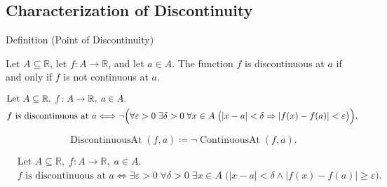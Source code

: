 
\subsection*{Characterization of Discontinuity}
\label{sec:discontinuity}

\begin{definitionbox}{Definition (Point of Discontinuity)}
\begin{definition}
\label{def:point-of-discontinuity}
Let $A \subseteq \mathbb{R}$, let $f \colon A \to \mathbb{R}$, and let $a \in A$. The function $f$ is discontinuous at $a$ if and only if $f$ is not continuous at $a$.
\end{definition}
\end{definitionbox}

\begin{remark*}
\[
\begin{aligned}
&\text{Let } A \subseteq \mathbb{R},\; f \colon A \to \mathbb{R},\; a \in A.\\
&f \text{ is discontinuous at } a
\Longleftrightarrow
\neg\Bigl(\forall \varepsilon > 0\; \exists \delta > 0\; \forall x \in A\;
\bigl(|x-a|<\delta \Rightarrow |f(x)-f(a)| < \varepsilon\bigr)\Bigr).
\end{aligned}
\]
\end{remark*}

\begin{remark*}
\[
\operatorname{DiscontinuousAt}(f,a) \coloneqq \neg \operatorname{ContinuousAt}(f,a).
\]
\end{remark*}

\begin{remark*}
\[
\begin{aligned}
&\text{Let } A \subseteq \mathbb{R},\; f \colon A \to \mathbb{R},\; a \in A.\\
&f \text{ is discontinuous at } a
\Longleftrightarrow
\exists \varepsilon > 0\; \forall \delta > 0\; \exists x \in A\;
\bigl(|x-a|<\delta \land |f(x)-f(a)| \ge \varepsilon\bigr).
\end{aligned}
\]
\end{remark*}

